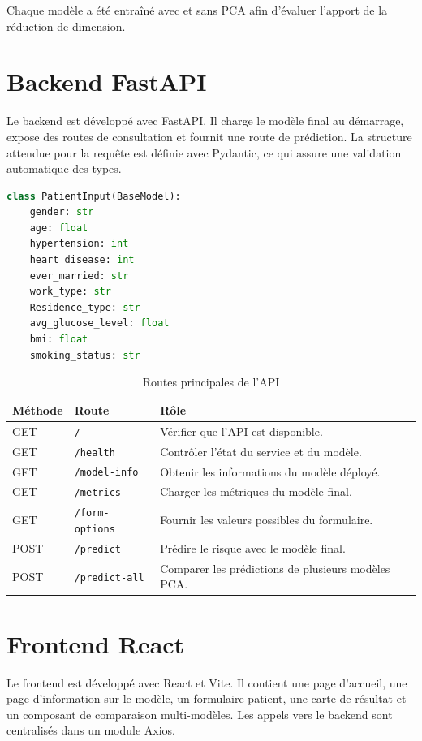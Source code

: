 \documentclass[12pt,a4paper]{report}
\begin{document}
Chaque modèle a été entraîné avec et sans PCA afin d'évaluer l'apport de la réduction de dimension.

\section{Backend FastAPI}
Le backend est développé avec FastAPI. Il charge le modèle final au démarrage, expose des routes de consultation et fournit une route de prédiction. La structure attendue pour la requête est définie avec Pydantic, ce qui assure une validation automatique des types.

\begin{lstlisting}[language=Python,caption={Structure simplifiée d'une entrée patient}]
class PatientInput(BaseModel):
    gender: str
    age: float
    hypertension: int
    heart_disease: int
    ever_married: str
    work_type: str
    Residence_type: str
    avg_glucose_level: float
    bmi: float
    smoking_status: str
\end{lstlisting}

\begin{table}[H]
\centering
\caption{Routes principales de l'API}
\begin{tabularx}{\textwidth}{p{3.2cm}p{4cm}X}
\toprule
\textbf{Méthode} & \textbf{Route} & \textbf{Rôle}\\
\midrule
GET & \texttt{/} & Vérifier que l'API est disponible.\\
GET & \texttt{/health} & Contrôler l'état du service et du modèle.\\
GET & \texttt{/model-info} & Obtenir les informations du modèle déployé.\\
GET & \texttt{/metrics} & Charger les métriques du modèle final.\\
GET & \texttt{/form-options} & Fournir les valeurs possibles du formulaire.\\
POST & \texttt{/predict} & Prédire le risque avec le modèle final.\\
POST & \texttt{/predict-all} & Comparer les prédictions de plusieurs modèles PCA.\\
\bottomrule
\end{tabularx}
\end{table}

\section{Frontend React}
Le frontend est développé avec React et Vite. Il contient une page d'accueil, une page d'information sur le modèle, un formulaire patient, une carte de résultat et un composant de comparaison multi-modèles. Les appels vers le backend sont centralisés dans un module Axios.
\end{document}
